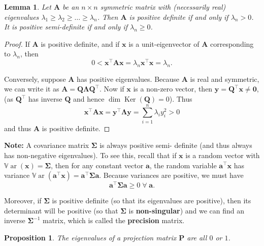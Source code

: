 \documentclass[
]{book}
\newtheorem{lemma}{Lemma}[chapter]
\newtheorem{proposition}{Proposition}[chapter]
\theoremstyle{definition}
\theoremstyle{definition}
\theoremstyle{definition}
\theoremstyle{definition}
\theoremstyle{remark}
\begin{document}
\begin{lemma}
\protect\hypertarget{lem:eigposdef}{}\label{lem:eigposdef}Let \(\mathbf A\) be an \(n \times n\) symmetric matrix
with (necessarily real) eigenvalues \(\lambda _1 \geq \lambda _2 \geq
\dots \geq \lambda _n\). Then \(\mathbf A\) is \emph{positive definite}
if and only if \(\lambda _n >0\). It is positive semi-definite if and only if \(\lambda_n \geq 0\).
\end{lemma}

\begin{proof}
If \(\mathbf A\) is positive definite, and if \(\mathbf x\) is a unit-eigenvector of \(\mathbf A\) corresponding to \(\lambda_n\), then
\[0<\mathbf x^\top \mathbf A\mathbf x= \lambda_n \mathbf x^\top \mathbf x= \lambda_n.\]

Conversely, suppose \(\mathbf A\) has positive eigenvalues. Because \(\mathbf A\) is real and symmetric, we can write it as \(\mathbf A=\mathbf Q\boldsymbol \Lambda\mathbf Q^\top\). Now if \(\mathbf x\) is a non-zero vector, then \(\mathbf y= \mathbf Q^\top \mathbf x\not= {\boldsymbol 0}\), (as \(\mathbf Q^\top\) has inverse \(\mathbf Q\) and hence \(\dim \operatorname{Ker}(\mathbf Q)=0\)). Thus
\[\mathbf x^\top \mathbf A\mathbf x= \mathbf y^\top \boldsymbol \Lambda\mathbf y= \sum_{i=1}^n \lambda_i y_i^2 >0\] and thus \(\mathbf A\) is positive definite.
\end{proof}

\textbf{Note:} A covariance matrix \(\boldsymbol{\Sigma}\) is always positive semi-
definite (and thus always has non-negative eigenvalues). To see this, recall that if \(\mathbf x\) is a random vector with \({\mathbb{V}\operatorname{ar}}(\mathbf x)=\boldsymbol{\Sigma}\), then for any constant vector \(\mathbf a\), the random variable \(\mathbf a^\top \mathbf x\) has variance \({\mathbb{V}\operatorname{ar}}(\mathbf a^\top \mathbf x)=\mathbf a^\top \boldsymbol{\Sigma}\mathbf a\). Because variances are positive, we must have
\[\mathbf a^\top \boldsymbol{\Sigma}\mathbf a\geq 0 \;\forall \;\mathbf a.\]

Moreover, if \(\boldsymbol{\Sigma}\) is positive definite (so that its eigenvalues are positive), then its
determinant will be positive (so that \(\boldsymbol{\Sigma}\) is \textbf{non-singular}) and we can find an inverse \(\boldsymbol{\Sigma}^{-1}\) matrix, which is called the \textbf{precision} matrix.

\begin{proposition}
\protect\hypertarget{prp:eigproj}{}\label{prp:eigproj}The eigenvalues of a projection matrix \(\mathbf P\) are all \(0\) or \(1\).
\end{proposition}
\end{document}

